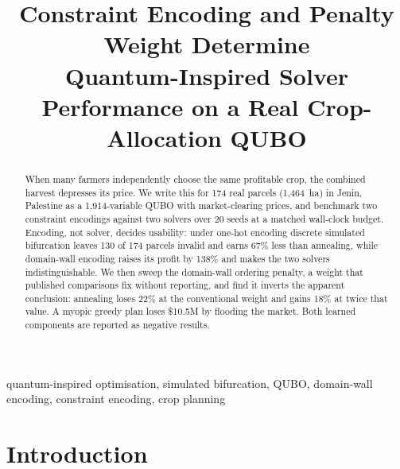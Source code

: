 \documentclass[conference,a4paper]{IEEEtran}
\newif\ifblind
\begin{document}
\title{Constraint Encoding and Penalty Weight Determine\\Quantum-Inspired
Solver Performance on a Real Crop-Allocation QUBO}

\ifblind
  \author{\IEEEauthorblockN{Anonymous Submission}
  \IEEEauthorblockA{NGIA-QC 2026 --- Double-blind review}}
\else
  \author{
  \and
  }
\fi

\maketitle
\thispagestyle{empty}

\begin{abstract}
When many farmers independently choose the same profitable crop, the combined
harvest depresses its price. We write this for 174 real parcels (1{,}464~ha)
in Jenin, Palestine as a 1{,}914-variable QUBO with market-clearing prices,
and benchmark two constraint encodings against two solvers over 20 seeds at a
matched wall-clock budget. Encoding, not solver, decides usability: under
one-hot encoding discrete simulated bifurcation leaves 130 of 174 parcels
invalid and earns 67\% less than annealing, while domain-wall encoding raises
its profit by 138\% and makes the two solvers indistinguishable. We then sweep
the domain-wall ordering penalty, a weight that published comparisons fix
without reporting, and find it inverts the apparent conclusion: annealing
loses 22\% at the conventional weight and gains 18\% at twice that value. A
myopic greedy plan loses \$10.5M by flooding the market. Both learned
components are reported as negative results.
\end{abstract}

\begin{IEEEkeywords}
quantum-inspired optimisation, simulated bifurcation, QUBO, domain-wall
encoding, constraint encoding, crop planning
\end{IEEEkeywords}

\section{Introduction}
\end{document}
